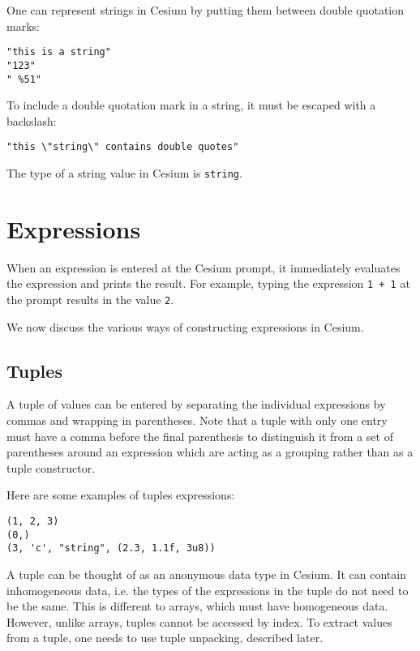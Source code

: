 \documentclass[a4paper,10pt]{article}
\newcommand{\code}{\lstinline}
\begin{document}
One can represent strings in Cesium by putting them between double quotation marks:

\begin{lstlisting}
"this is a string"
"123"
" %51"
\end{lstlisting}

To include a double quotation mark in a string, it must be escaped with a backslash:

\begin{lstlisting}
"this \"string\" contains double quotes"
\end{lstlisting}

The type of a string value in Cesium is \code{string}.

\section{Expressions}

When an expression is entered at the Cesium prompt, it immediately evaluates the 
expression and prints the result. For example, typing the expression \code{1 + 1} at
the prompt results in the value \code{2}.

We now discuss the various ways of constructing expressions in Cesium.

\subsection{Tuples}

A tuple of values can be entered by separating the individual expressions by commas and
wrapping in parentheses. Note that a tuple with only one entry must have a comma before
the final parenthesis to distinguish it from a set of parentheses around an expression
which are acting as a grouping rather than as a tuple constructor.

Here are some examples of tuples expressions:

\begin{lstlisting}
(1, 2, 3)
(0,)
(3, 'c', "string", (2.3, 1.1f, 3u8))
\end{lstlisting}

A tuple can be thought of as an anonymous data type in Cesium. It can contain inhomogeneous
data, i.e. the types of the expressions in the tuple do not need to be the same. This is 
different to arrays, which must have homogeneous data. However, unlike arrays, tuples cannot 
be accessed by index. To extract values from a tuple, one needs to use tuple unpacking, described 
later.
\end{document}
